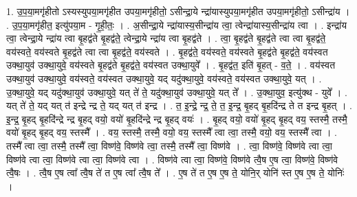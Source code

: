 \documentclass[17pt]{extarticle}
\begin{document}
1. उ॒प॒या॒मगृ॑हीतो ऽस्यस्युपया॒मगृ॑हीत उपया॒मगृ॑हीतो॒ ऽसीन्द्रा॒ये न्द्रा॑यास्युपया॒मगृ॑हीत उपया॒मगृ॑हीतो॒ ऽसीन्द्रा॑य । . उ॒प॒या॒मगृ॑हीत॒ इत्यु॑पया॒म - गृ॒ही॒तः॒ । . अ॒सीन्द्रा॒ये न्द्रा॑यास्य॒सीन्द्रा॑य त्वा॒ त्वेन्द्रा॑यास्य॒सीन्द्रा॑य त्वा । . इन्द्रा॑य त्वा॒ त्वेन्द्रा॒ये न्द्रा॑य त्वा बृ॒हद्व॑ते बृ॒हद्व॑ते॒ त्वेन्द्रा॒ये न्द्रा॑य त्वा बृ॒हद्व॑ते । . त्वा॒ बृ॒हद्व॑ते बृ॒हद्व॑ते त्वा त्वा बृ॒हद्व॑ते॒ वय॑स्वते॒ वय॑स्वते बृ॒हद्व॑ते त्वा त्वा बृ॒हद्व॑ते॒ वय॑स्वते । . बृ॒हद्व॑ते॒ वय॑स्वते॒ वय॑स्वते बृ॒हद्व॑ते बृ॒हद्व॑ते॒ वय॑स्वत उक्था॒युव॑ उक्था॒युवे॒ वय॑स्वते बृ॒हद्व॑ते बृ॒हद्व॑ते॒ वय॑स्वत उक्था॒युवे᳚ । . बृ॒हद्व॑त॒ इति॑ बृ॒हत् - व॒ते॒ । . वय॑स्वत उक्था॒युव॑ उक्था॒युवे॒ वय॑स्वते॒ वय॑स्वत उक्था॒युवे॒ यद् यदु॑क्था॒युवे॒ वय॑स्वते॒ वय॑स्वत उक्था॒युवे॒ यत् । . उ॒क्था॒युवे॒ यद् यदु॑क्था॒युव॑ उक्था॒युवे॒ यत् ते॑ ते॒ यदु॑क्था॒युव॑ उक्था॒युवे॒ यत् ते᳚ । . उ॒क्था॒युव॒ इत्यु॑क्थ - युवे᳚ । . यत् ते॑ ते॒ यद् यत् त॑ इन्द्रे न्द्र ते॒ यद् यत् त॑ इन्द्र । . त॒ इ॒न्द्रे॒ न्द्र॒ ते॒ त॒ इ॒न्द्र॒ बृ॒हद् बृ॒हदि॑न्द्र ते त इन्द्र बृ॒हत् । . इ॒न्द्र॒ बृ॒हद् बृ॒हदि॑न्द्रे न्द्र बृ॒हद् वयो॒ वयो॑ बृ॒हदि॑न्द्रे न्द्र बृ॒हद् वयः॑ । . बृ॒हद् वयो॒ वयो॑ बृ॒हद् बृ॒हद् वय॒ स्तस्मै॒ तस्मै॒ वयो॑ बृ॒हद् बृ॒हद् वय॒ स्तस्मै᳚ । . वय॒ स्तस्मै॒ तस्मै॒ वयो॒ वय॒ स्तस्मै᳚ त्वा त्वा॒ तस्मै॒ वयो॒ वय॒ स्तस्मै᳚ त्वा । . तस्मै᳚ त्वा त्वा॒ तस्मै॒ तस्मै᳚ त्वा॒ विष्ण॑वे॒ विष्ण॑वे त्वा॒ तस्मै॒ तस्मै᳚ त्वा॒ विष्ण॑वे । . त्वा॒ विष्ण॑वे॒ विष्ण॑वे त्वा त्वा॒ विष्ण॑वे त्वा त्वा॒ विष्ण॑वे त्वा त्वा॒ विष्ण॑वे त्वा । . विष्ण॑वे त्वा त्वा॒ विष्ण॑वे॒ विष्ण॑वे त्वै॒ष ए॒ष त्वा॒ विष्ण॑वे॒ विष्ण॑वे त्वै॒षः । . त्वै॒ष ए॒ष त्वा᳚ त्वै॒ष ते॑ त ए॒ष त्वा᳚ त्वै॒ष ते᳚ । . ए॒ष ते॑ त ए॒ष ए॒ष ते॒ योनि॒र् योनि॑ स्त ए॒ष ए॒ष ते॒ योनिः॑ । \newline
\end{document}
